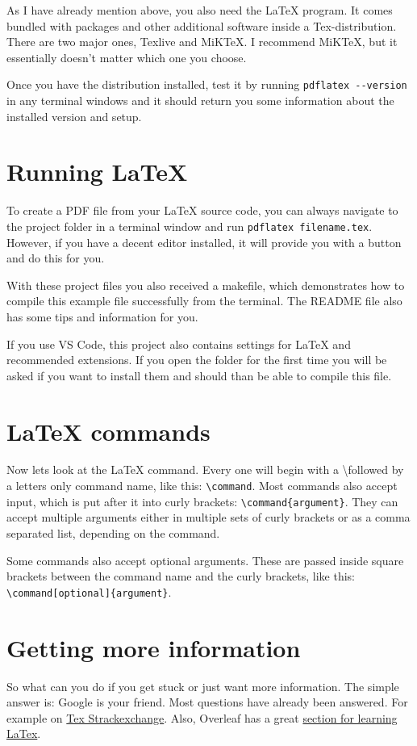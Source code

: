 \documentclass[	%
		fontsize=11pt,  %
		a4paper,	    %
		english,		%
		sans,			%
		f1,				%
	]{HsH-report}		%
\begin{document}
		\pagebreak\medskip
		As I have already mention above, you also need the LaTeX program. It comes bundled with packages and other additional software inside a
		Tex-distribution. There are two major ones, Texlive and MiKTeX. I recommend MiKTeX, but it essentially doesn't matter which one you choose.

		Once you have the distribution installed, test it by running \lstinline{pdflatex --version} in any terminal windows and it should return you
		some information about the installed version and setup.

	\section{Running LaTeX}
		To create a PDF file from your LaTeX source code, you can always navigate to the project folder in a terminal window and run
		\lstinline{pdflatex filename.tex}. However, if you have a decent editor installed, it will provide you with a button and do this for you.

		With these project files you also received a makefile, which demonstrates how to compile this example file successfully from the terminal. The
		README file also has some tips and information for you.

		If you use VS Code, this project also contains settings for LaTeX and recommended extensions. If you open the folder for the first time you
		will be asked if you want to install them and should than be able to compile this file.

	\section{LaTeX commands}
		Now lets look at the LaTeX command. Every one will begin with a \textbackslash\space followed by a letters only command name, like this:
		\lstinline|\command|. Most commands also accept input, which is put after it into curly brackets: \lstinline|\command{argument}|. They can
		accept multiple arguments either in multiple sets of curly brackets or as a comma separated list, depending on the command.

		Some commands also accept optional arguments. These are passed inside square brackets between the command name and the curly brackets, like
		this: \lstinline|\command[optional]{argument}|.

	\section{Getting more information}
		So what can you do if you get stuck or just want more information. The simple answer is: Google is your friend. Most questions have already
		been answered. For example on \href{https://tex.stackexchange.com/}{Tex Strackexchange}. Also, Overleaf has a great
		\href{https://www.overleaf.com/learn}{section for learning LaTex}.
\end{document}

